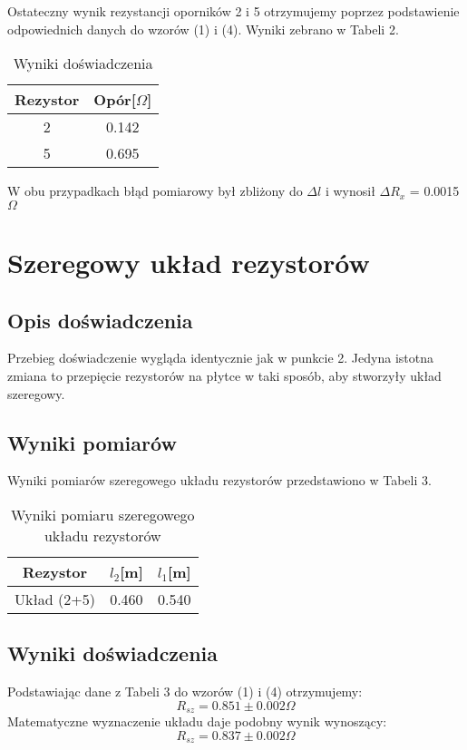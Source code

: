 \documentclass{article} %
\begin{document}
Ostateczny wynik rezystancji oporników 2 i 5 otrzymujemy poprzez podstawienie odpowiednich danych do wzorów (1) i (4). Wyniki zebrano w Tabeli 2.

\begin{table}[h!]
\centering
\begin{tabular}{|c|c|}
\hline
\textbf{Rezystor} & \textbf{Opór[$\Omega$]} \\
\hline
 2 & 0.142 \\
 5 & 0.695 \\
\hline
\end{tabular}
\caption{Wyniki doświadczenia}
\label{table:students}
\end{table}
W obu przypadkach błąd pomiarowy był zbliżony do $\Delta l$ i wynosił $\Delta R_x$ = 0.0015$\Omega$

\section{Szeregowy układ rezystorów}

\subsection{Opis doświadczenia}

Przebieg doświadczenie wygląda identycznie jak w punkcie 2. Jedyna istotna zmiana to przepięcie rezystorów na płytce w taki sposób, aby stworzyły układ szeregowy.

\subsection{Wyniki pomiarów}

Wyniki pomiarów szeregowego układu rezystorów przedstawiono w Tabeli 3.

\begin{table}[h!]
\centering
\begin{tabular}{|c|c|c|}
\hline
\textbf{Rezystor} & \textbf{$l_2$[m]} & \textbf{$l_1$[m]} \\
\hline
 Układ (2+5) & 0.460 & 0.540 \\
\hline
\end{tabular}
\caption{Wyniki pomiaru szeregowego układu rezystorów}
\label{table:students}
\end{table}

\subsection{Wyniki doświadczenia}
Podstawiając dane z Tabeli 3 do wzorów (1) i (4) otrzymujemy:
{\large
\begin{equation}
    R_{sz} = 0.851\pm0.002\Omega
\end{equation}
}
Matematyczne wyznaczenie układu daje podobny wynik wynoszący:
{\large
\begin{equation}
    R_{sz} = 0.837\pm0.002\Omega
\end{equation}
}
\end{document}
